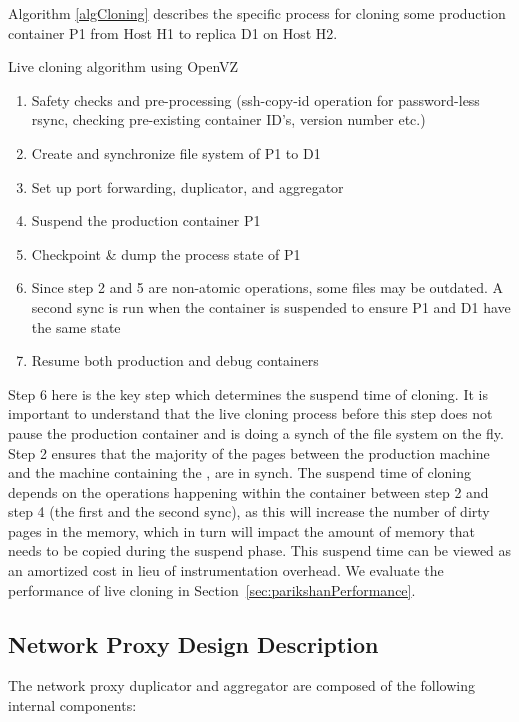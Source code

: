 Algorithm \ref{algCloning} describes the specific process for cloning some production container P1 from Host H1 to replica D1 on Host H2.


\begin{algorithm}[ht!]
	\caption{Live cloning algorithm using OpenVZ} 
	\label{algCloning}
	\begin{enumerate}[topsep=0pt,itemsep=-1ex,partopsep=1ex,parsep=1ex]
		\item Safety checks and pre-processing (ssh-copy-id operation for password-less rsync, checking pre-existing container ID's, version number etc.) 
		\item Create and synchronize file system of P1 to D1  
		\item Set up port forwarding, duplicator, and aggregator
		\item Suspend the production container P1
		\item Checkpoint \& dump the process state of P1
		\item Since step 2 and 5 are non-atomic operations, some files may be outdated.
		A second sync is run when the container is suspended to ensure P1 and D1 have the same state
		\item Resume both production and debug containers
	\end{enumerate}
\end{algorithm}

Step 6 here is the key step which determines the suspend time of cloning. It is important to understand that the live cloning process before this step does not pause the production container and is doing a synch of the file system on the fly. Step 2 ensures that the majority of the pages between the production machine and the machine containing the \debugcontainer, are in synch.
The suspend time of cloning depends on the operations happening within the container between step 2 and step 4 (the first and the second sync), as this will increase the number of dirty pages in the memory, which in turn will impact the amount of memory that needs to be copied during the suspend phase.
This suspend time can be viewed as an amortized cost in lieu of instrumentation overhead.
We evaluate the performance of live cloning in Section~\ref{sec:parikshanPerformance}.

\subsection{Network Proxy Design Description}

The network proxy duplicator and aggregator are composed of the following internal components:

